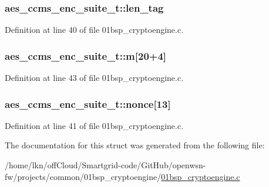 \subsubsection[{\texorpdfstring{len\+\_\+tag}{len_tag}}]{ aes\+\_\+ccms\+\_\+enc\+\_\+suite\+\_\+t\+::len\+\_\+tag}\hypertarget{structaes__ccms__enc__suite__t_acb24be0bfbdc874dab8ab1d28f3316cc}{}\label{structaes__ccms__enc__suite__t_acb24be0bfbdc874dab8ab1d28f3316cc}


Definition at line 40 of file 01bsp\+\_\+cryptoengine.\+c.

\subsubsection[{\texorpdfstring{m}{m}}]{ aes\+\_\+ccms\+\_\+enc\+\_\+suite\+\_\+t\+::m\mbox{[}20+4\mbox{]}}\hypertarget{structaes__ccms__enc__suite__t_a7088aa21f27354139c84201c2a96210c}{}\label{structaes__ccms__enc__suite__t_a7088aa21f27354139c84201c2a96210c}


Definition at line 43 of file 01bsp\+\_\+cryptoengine.\+c.

\subsubsection[{\texorpdfstring{nonce}{nonce}}]{ aes\+\_\+ccms\+\_\+enc\+\_\+suite\+\_\+t\+::nonce\mbox{[}13\mbox{]}}\hypertarget{structaes__ccms__enc__suite__t_a241213bc91df055057be51ed169e0a99}{}\label{structaes__ccms__enc__suite__t_a241213bc91df055057be51ed169e0a99}


Definition at line 41 of file 01bsp\+\_\+cryptoengine.\+c.



The documentation for this struct was generated from the following file\+:\begin{DoxyCompactItemize}
\item 
/home/lkn/off\+Cloud/\+Smartgrid-\/code/\+Git\+Hub/openwsn-\/fw/projects/common/01bsp\+\_\+cryptoengine/\hyperlink{01bsp__cryptoengine_8c}{01bsp\+\_\+cryptoengine.\+c}\end{DoxyCompactItemize}

